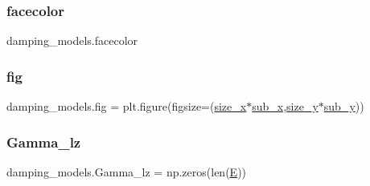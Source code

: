 \mbox{\label{namespacedamping__models_afb27afc9db4d58b425db77e3e21bc561}} 
\subsubsection{\texorpdfstring{facecolor}{facecolor}}
{\footnotesize\ttfamily damping\+\_\+models.\+facecolor}

\mbox{\label{namespacedamping__models_a9edc55435ab0261056120b91d9429732}} 
\subsubsection{\texorpdfstring{fig}{fig}}
{\footnotesize\ttfamily damping\+\_\+models.\+fig = plt.\+figure(figsize=(\hyperlink{namespacedamping__models_ad177f5fb45aa58d2c69cb5d37081fef9}{size\+\_\+x}$\ast$\hyperlink{namespacedamping__models_aae4b7950d55590d8c77efbf6a66533ab}{sub\+\_\+x},\hyperlink{namespacedamping__models_adf075db45ffa06f4e7b0c911fe5a74fd}{size\+\_\+y}$\ast$\hyperlink{namespacedamping__models_a61a5ecedcc2899f63db8a15ab7af5699}{sub\+\_\+y}))}

\mbox{\label{namespacedamping__models_ad55f3e4220d6d48fa772baf38f96a0cc}} 
\subsubsection{\texorpdfstring{Gamma\+\_\+lz}{Gamma\_lz}}
{\footnotesize\ttfamily damping\+\_\+models.\+Gamma\+\_\+lz = np.\+zeros(len(\hyperlink{namespacedamping__models_a2d49832acd95610ad1ef20d532cda813}{E}))}

\mbox{\label{namespacedamping__models_a8935086de67d3e941e639d12588215e1}} 
